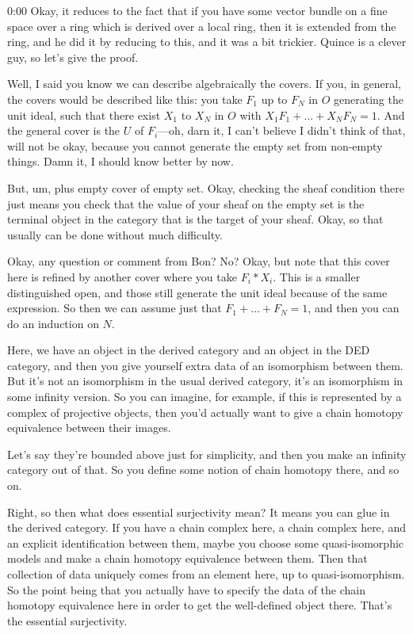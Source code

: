 \begin{unfinished}{0:00}
Okay, it reduces to the fact that if you have some vector bundle on a fine space over a ring which is derived over a local ring, then it is extended from the ring, and he did it by reducing to this, and it was a bit trickier. Quince is a clever guy, so let's give the proof.

Well, I said you know we can describe algebraically the covers. If you, in general, the covers would be described like this: you take $F_1$ up to $F_N$ in $O$ generating the unit ideal, such that there exist $X_1$ to $X_N$ in $O$ with $X_1 F_1 + \dots + X_N F_N = 1$. And the general cover is the $U$ of $F_i$---oh, darn it, I can't believe I didn't think of that, will not be okay, because you cannot generate the empty set from non-empty things. Damn it, I should know better by now.

But, um, plus empty cover of empty set. Okay, checking the sheaf condition there just means you check that the value of your sheaf on the empty set is the terminal object in the category that is the target of your sheaf. Okay, so that usually can be done without much difficulty.

Okay, any question or comment from Bon? No? Okay, but note that this cover here is refined by another cover where you take $F_i * X_i$. This is a smaller distinguished open, and those still generate the unit ideal because of the same expression. So then we can assume just that $F_1 + \dots + F_N = 1$, and then you can do an induction on $N$.

Here, we have an object in the derived category and an object in the DED category, and then you give yourself extra data of an isomorphism between them. But it's not an isomorphism in the usual derived category, it's an isomorphism in some infinity version. So you can imagine, for example, if this is represented by a complex of projective objects, then you'd actually want to give a chain homotopy equivalence between their images.

Let's say they're bounded above just for simplicity, and then you make an infinity category out of that. So you define some notion of chain homotopy there, and so on.

Right, so then what does essential surjectivity mean? It means you can glue in the derived category. If you have a chain complex here, a chain complex here, and an explicit identification between them, maybe you choose some quasi-isomorphic models and make a chain homotopy equivalence between them. Then that collection of data uniquely comes from an element here, up to quasi-isomorphism. So the point being that you actually have to specify the data of the chain homotopy equivalence here in order to get the well-defined object there. That's the essential surjectivity.


\end{unfinished}
